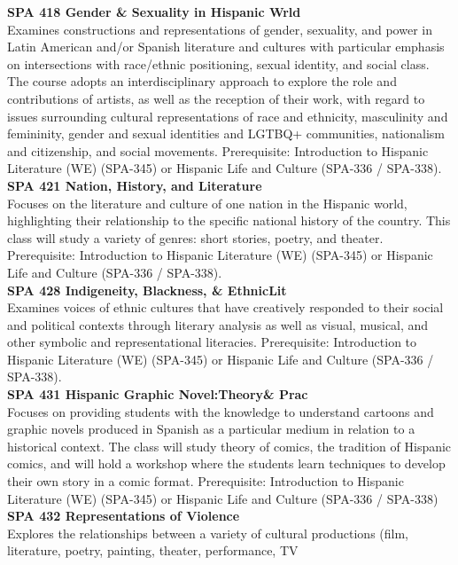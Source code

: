 \documentclass[
  letterpaper,
]{scrbook}
\begin{document}
\textbf{SPA 418 Gender \& Sexuality in Hispanic Wrld}\\
Examines constructions and representations of gender, sexuality, and
power in Latin American and/or Spanish literature and cultures with
particular emphasis on intersections with race/ethnic positioning,
sexual identity, and social class. The course adopts an
interdisciplinary approach to explore the role and contributions of
artists, as well as the reception of their work, with regard to issues
surrounding cultural representations of race and ethnicity, masculinity
and femininity, gender and sexual identities and LGTBQ+ communities,
nationalism and citizenship, and social movements. Prerequisite:
Introduction to Hispanic Literature (WE) (SPA-345) or Hispanic Life and
Culture (SPA-336 / SPA-338).\\
\textbf{SPA 421 Nation, History, and Literature}\\
Focuses on the literature and culture of one nation in the Hispanic
world, highlighting their relationship to the specific national history
of the country. This class will study a variety of genres: short
stories, poetry, and theater. Prerequisite: Introduction to Hispanic
Literature (WE) (SPA-345) or Hispanic Life and Culture (SPA-336 /
SPA-338).\\
\textbf{SPA 428 Indigeneity, Blackness, \& EthnicLit}\\
Examines voices of ethnic cultures that have creatively responded to
their social and political contexts through literary analysis as well as
visual, musical, and other symbolic and representational literacies.
Prerequisite: Introduction to Hispanic Literature (WE) (SPA-345) or
Hispanic Life and Culture (SPA-336 / SPA-338).\\
\textbf{SPA 431 Hispanic Graphic Novel:Theory\& Prac}\\
Focuses on providing students with the knowledge to understand cartoons
and graphic novels produced in Spanish as a particular medium in
relation to a historical context. The class will study theory of comics,
the tradition of Hispanic comics, and will hold a workshop where the
students learn techniques to develop their own story in a comic format.
Prerequisite: Introduction to Hispanic Literature (WE) (SPA-345) or
Hispanic Life and Culture (SPA-336 / SPA-338)\\
\textbf{SPA 432 Representations of Violence}\\
Explores the relationships between a variety of cultural productions
(film, literature, poetry, painting, theater, performance, TV
\end{document}
